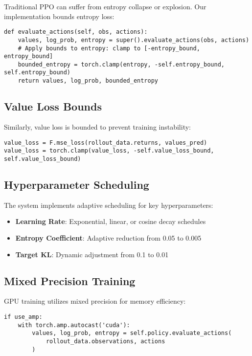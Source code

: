 \documentclass[11pt,a4paper]{article}
\begin{document}
Traditional PPO can suffer from entropy collapse or explosion. Our implementation bounds entropy loss:

\begin{lstlisting}[caption={Bounded Entropy Policy (bounded\_entropy\_ppo.py:64-80)}]
def evaluate_actions(self, obs, actions):
    values, log_prob, entropy = super().evaluate_actions(obs, actions)
    # Apply bounds to entropy: clamp to [-entropy_bound, entropy_bound]
    bounded_entropy = torch.clamp(entropy, -self.entropy_bound, self.entropy_bound)
    return values, log_prob, bounded_entropy
\end{lstlisting}

\subsection{Value Loss Bounds}

Similarly, value loss is bounded to prevent training instability:

\begin{lstlisting}[caption={Value Loss Clipping (bounded\_entropy\_ppo.py:286-291)}]
value_loss = F.mse_loss(rollout_data.returns, values_pred)
value_loss = torch.clamp(value_loss, -self.value_loss_bound, self.value_loss_bound)
\end{lstlisting}

\subsection{Hyperparameter Scheduling}

The system implements adaptive scheduling for key hyperparameters:

\begin{itemize}
    \item \textbf{Learning Rate}: Exponential, linear, or cosine decay schedules
    \item \textbf{Entropy Coefficient}: Adaptive reduction from 0.05 to 0.005
    \item \textbf{Target KL}: Dynamic adjustment from 0.1 to 0.01
\end{itemize}

\subsection{Mixed Precision Training}

GPU training utilizes mixed precision for memory efficiency:

\begin{lstlisting}[caption={Mixed Precision Support (bounded\_entropy\_ppo.py:252-256)}]
if use_amp:
    with torch.amp.autocast('cuda'):
        values, log_prob, entropy = self.policy.evaluate_actions(
            rollout_data.observations, actions
        )
\end{lstlisting}
\end{document}
